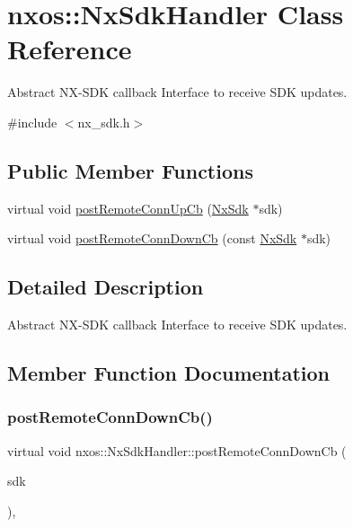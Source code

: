 \hypertarget{classnxos_1_1_nx_sdk_handler}{}\section{nxos\+:\+:Nx\+Sdk\+Handler Class Reference}
\label{classnxos_1_1_nx_sdk_handler}


Abstract N\+X-\/\+S\+DK callback Interface to receive S\+DK updates.  




{\ttfamily \#include $<$nx\+\_\+sdk.\+h$>$}

\subsection*{Public Member Functions}
\begin{DoxyCompactItemize}
\item 
virtual void \mbox{\hyperlink{classnxos_1_1_nx_sdk_handler_a71b575abab99f8798635035986dbdc3f}{post\+Remote\+Conn\+Up\+Cb}} (\mbox{\hyperlink{classnxos_1_1_nx_sdk}{Nx\+Sdk}} $\ast$sdk)
\item 
virtual void \mbox{\hyperlink{classnxos_1_1_nx_sdk_handler_a433426269ae0b8374f3ead9f06edeb0b}{post\+Remote\+Conn\+Down\+Cb}} (const \mbox{\hyperlink{classnxos_1_1_nx_sdk}{Nx\+Sdk}} $\ast$sdk)
\end{DoxyCompactItemize}


\subsection{Detailed Description}
Abstract N\+X-\/\+S\+DK callback Interface to receive S\+DK updates. 

\subsection{Member Function Documentation}
\mbox{\label{classnxos_1_1_nx_sdk_handler_a433426269ae0b8374f3ead9f06edeb0b}} 
\subsubsection{\texorpdfstring{post\+Remote\+Conn\+Down\+Cb()}{postRemoteConnDownCb()}}
{\footnotesize\ttfamily virtual void nxos\+::\+Nx\+Sdk\+Handler\+::post\+Remote\+Conn\+Down\+Cb (\begin{DoxyParamCaption}\item[{const \mbox{\hyperlink{classnxos_1_1_nx_sdk}{Nx\+Sdk}} $\ast$}]{sdk }\end{DoxyParamCaption})\hspace{0.3cm}{\ttfamily [inline]}, {\ttfamily [virtual]}}

